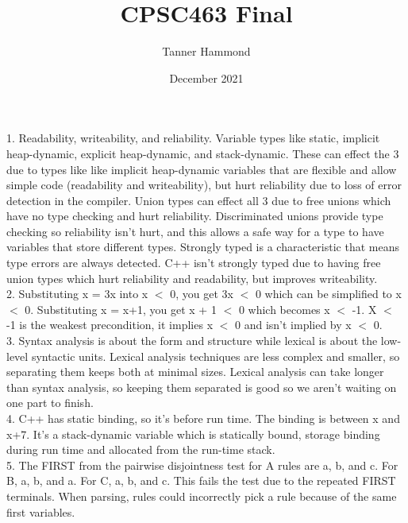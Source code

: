 \documentclass{article}
\title{CPSC463 Final}
\author{Tanner Hammond}
\date{December 2021}
\begin{document}
\maketitle

1. Readability, writeability, and reliability. Variable types like static, implicit heap-dynamic, explicit heap-dynamic, and stack-dynamic. These can effect the 3 due to types like like implicit heap-dynamic variables that are flexible and allow simple code (readability and writeability), but hurt reliability due to loss of error detection in the compiler. Union types can effect all 3 due to free unions which have no type checking and hurt reliability. Discriminated unions provide type checking so reliability isn't hurt, and this allows a safe way for a type to have variables that store different types. Strongly typed is a characteristic that means type errors are always detected. C++ isn't strongly typed due to having free union types which hurt reliability and readability, but improves writeability.\\
2. Substituting x = 3x into x $<$ 0, you get 3x $<$ 0 which can be simplified to x $<$ 0. Substituting x = x+1, you get x + 1 $<$ 0 which becomes x $<$ -1. X $<$ -1 is the weakest precondition, it implies x $<$ 0 and isn't implied by x $<$ 0. 
\\
3. Syntax analysis is about the form and structure while lexical is about the low-level syntactic units. Lexical analysis techniques are less complex and smaller, so separating them keeps both at minimal sizes. Lexical analysis can take longer than syntax analysis, so keeping them separated is good so we aren't waiting on one part to finish.
\\
4. C++ has static binding, so it's before run time. The binding is between x and x+7. It's a stack-dynamic variable which is statically bound, storage binding during run time and allocated from the run-time stack.
\\
5. The FIRST from the pairwise disjointness test for A rules are a, b, and c. For B, a, b, and a. For C, a, b, and c. This fails the test due to the repeated FIRST terminals. When parsing, rules could incorrectly pick a rule because of the same first variables.
\end{document}
